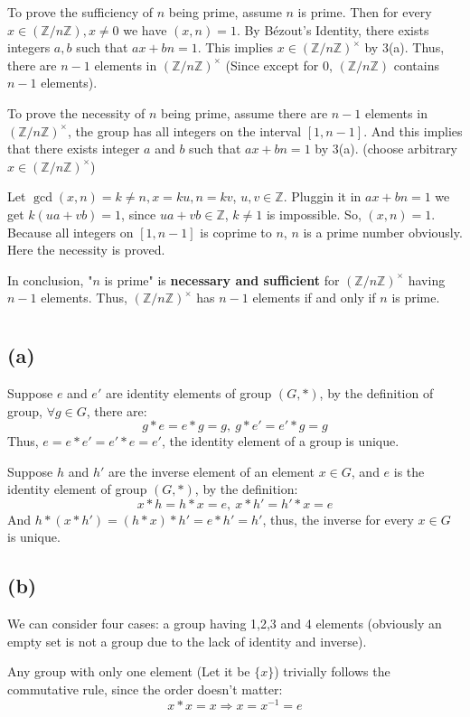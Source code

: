 \documentclass[12pt]{article}
\begin{document}
To prove the sufficiency of $n$ being prime, assume $n$ is prime. Then for every $x\in(\mathbb{Z}/n\mathbb{Z}), x\ne 0$ we have $(x,n)=1$. By Bézout's Identity, there exists integers $a,b$ such that $ax+bn=1$. This implies $x\in(\mathbb{Z}/n\mathbb{Z})^{\times}$ by 3(a). Thus, there are $n-1$ elements in $(\mathbb{Z}/n\mathbb{Z})^{\times}$ (Since except for $0$, $(\mathbb{Z}/n\mathbb{Z})$ contains $n-1$ elements).

To prove the necessity of $n$ being prime, assume there are $n-1$ elements in $(\mathbb{Z}/n\mathbb{Z})^{\times}$, the group has all integers on the interval $[1,n-1]$. And this implies that there exists integer $a$ and $b$ such that $ax+bn=1$ by 3(a). (choose arbitrary $x\in(\mathbb{Z}/n\mathbb{Z})^{\times}$) 

Let $\gcd{(x,n)}=k\ne n, x=ku, n=kv$, $u,v\in \mathbb{Z}$. Pluggin it in $ax+bn=1$ we get $k(ua+vb)=1$, since $ua+vb\in \mathbb{Z}$, $k\ne 1$ is impossible. So, $(x,n)=1$. Because all integers on $[1,n-1]$ is coprime to $n$, $n$ is a prime number obviously. Here the necessity is proved.

In conclusion, "$n$ is prime" is \textbf{necessary and sufficient} for $(\mathbb{Z}/n\mathbb{Z})^{\times}$ having $n-1$ elements. Thus, $(\mathbb{Z}/n\mathbb{Z})^{\times}$ has $n-1$ elements if and only if $n$ is prime.
\section{}
\subsection*{(a)}
Suppose $e$ and $e'$ are identity elements of group $(G,*)$, by the definition of group, $\forall g\in G$, there are:
$$g*e=e*g=g,\ g*e'=e'*g=g$$
Thus, $e=e*e'=e'*e=e'$, the identity element of a group is unique.

Suppose $h$ and $h'$ are the inverse element of an element $x\in G$, and $e$ is the identity element of group $(G,*)$, by the definition:
$$x*h=h*x=e,\ x*h'=h'*x=e$$
And $h*(x*h')=(h*x)*h'=e*h'=h'$, thus, the inverse for every $x\in G$ is unique.
\subsection*{(b)}
We can consider four cases: a group having 1,2,3 and 4 elements (obviously an empty set is not a group due to the lack of identity and inverse).

Any group with only one element (Let it be $\{x\}$) trivially follows the commutative rule, since the order doesn't matter:
$$x*x=x\Rightarrow x=x^{-1}=e$$
\end{document}
